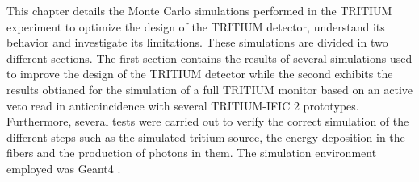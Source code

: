 This chapter details the Monte Carlo simulations performed in the TRITIUM experiment to optimize the design of the TRITIUM detector, understand its behavior and investigate its limitations. These simulations are divided in two different sections. The first section contains the results of several simulations used to improve the design of the TRITIUM detector while the second exhibits the results obtianed for the simulation of a full TRITIUM monitor based on an active veto read in anticoincidence with several TRITIUM-IFIC 2 prototypes. Furthermore, several tests were carried out to verify the correct simulation of the different steps such as the simulated tritium source, the energy deposition in the fibers and the production of photons in them. The simulation environment employed was Geant4 \cite{Geant4WebPage, Geant4P}.